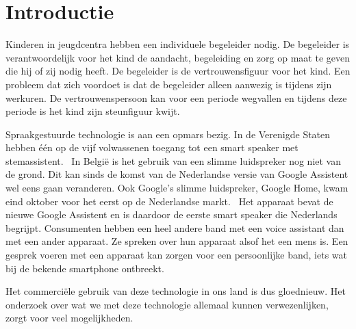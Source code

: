 
\section{Introductie} %
\label{sec:introductie}
Kinderen in jeugdcentra hebben een individuele begeleider nodig. De begeleider is verantwoordelijk voor het kind de aandacht, begeleiding en zorg op maat te geven die hij of zij nodig heeft. De begeleider is de vertrouwensfiguur voor het kind.
Een probleem dat zich voordoet is dat de begeleider alleen aanwezig is tijdens zijn werkuren. De vertrouwenspersoon kan voor een periode wegvallen en tijdens deze periode is het kind zijn steunfiguur kwijt.

Spraakgestuurde technologie is aan een opmars bezig. In de Verenigde Staten hebben één op de vijf volwassenen toegang tot een smart speaker met stemassistent.~\autocite{Passies2018} In België is het gebruik van een slimme luidspreker nog niet van de grond. Dit kan sinds de komst van de Nederlandse versie van Google Assistent wel eens gaan veranderen. Ook Google's slimme luidspreker, Google Home, kwam eind oktober voor het eerst op de Nederlandse markt.~\autocite{Haenen2018} Het apparaat bevat de nieuwe Google Assistent en is daardoor de eerste smart speaker die Nederlands begrijpt. Consumenten hebben een heel andere band met een voice assistant dan met een ander apparaat. Ze spreken over hun apparaat alsof het een mens is.\autocite{Schueler2018} Een gesprek voeren met een apparaat kan zorgen voor een persoonlijke band, iets wat bij de bekende smartphone ontbreekt.

Het commerciële gebruik van deze technologie in ons land is dus gloednieuw. Het onderzoek over wat we met deze technologie allemaal kunnen verwezenlijken, zorgt voor veel mogelijkheden.

